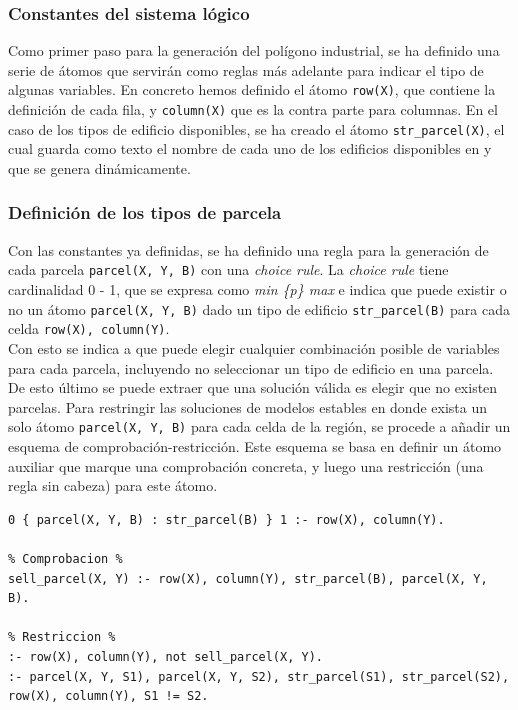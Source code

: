 \subsubsection{Constantes del sistema lógico}

Como primer paso para la generación del polígono industrial, se ha definido una serie de átomos que servirán como reglas más adelante para indicar el tipo de algunas variables. En concreto hemos definido el átomo \texttt{row(X)}, que contiene la definición de cada fila, y \texttt{column(X)} que es la contra parte para columnas. En el caso de los tipos de edificio disponibles, se ha creado el átomo \texttt{str\_parcel(X)}, el cual guarda como texto el nombre de cada uno de los edificios disponibles en \cities y que se genera dinámicamente.

\subsubsection{Definición de los tipos de parcela}

Con las constantes ya definidas, se ha definido una regla para la generación de cada parcela \texttt{parcel(X, Y, B)} con una \textit{choice rule}. La \textit{choice rule} tiene cardinalidad 0 - 1, que se expresa como \textit{min \{p\} max} e indica que puede existir o no un átomo \texttt{parcel(X, Y, B)} dado un tipo de edificio \texttt{str\_parcel(B)} para cada celda \texttt{row(X), column(Y)}. \\

Con esto se indica a \asp que puede elegir cualquier combinación posible de variables para cada parcela, incluyendo no seleccionar un tipo de edificio en una parcela. De esto último se puede extraer que una solución válida es elegir que no existen parcelas. Para restringir las soluciones de modelos estables en donde exista un solo átomo \texttt{parcel(X, Y, B)} para cada celda de la región, se procede a añadir un esquema de comprobación-restricción. Este esquema se basa en definir un átomo auxiliar que marque una comprobación concreta, y luego una restricción (una regla sin cabeza) para este átomo. \\

\begin{lstlisting}[caption={Código para la generación de parcelas},captionpos=b,label=lst:parcel_def]
% Generacion %
0 { parcel(X, Y, B) : str_parcel(B) } 1 :- row(X), column(Y).

% Comprobacion %
sell_parcel(X, Y) :- row(X), column(Y), str_parcel(B), parcel(X, Y, B).

% Restriccion %
:- row(X), column(Y), not sell_parcel(X, Y).
:- parcel(X, Y, S1), parcel(X, Y, S2), str_parcel(S1), str_parcel(S2), row(X), column(Y), S1 != S2.
\end{lstlisting}

